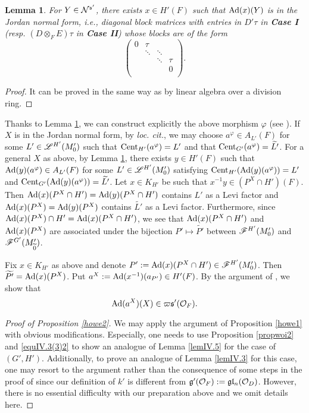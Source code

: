 \documentclass[a4paper]{amsart}
\newcommand{\wt}{\widetilde}                        \newcommand{\wh}{\widehat}                      \newcommand{\wpair}[1]{\left\{{#1}\right\}}
\newtheorem{lem}[thm]{Lemma}
\theoremstyle{definition}
\theoremstyle{remark}
\numberwithin{equation}{subsection}
\begin{document}
\begin{lem}\label{jordanform}
For $Y\in{\mathcal {N}}^{{\mathfrak{s}}'}$, there exists $x\in H'(F)$ such that ${\mathrm{Ad}}(x)(Y)$ is in the Jordan normal form, i.e., diagonal block matrices with entries in $D'\tau$ in \textbf{Case I} (resp. $(D\otimes_F E)\tau$ in \textbf{Case II}) whose blocks are of the form
$$ \left( \begin{array}{cccc}
  0 & \tau        &           &  \\
     & \ddots & \ddots &  \\
     &           & \ddots & \tau \\
     &           &           & 0  \\
  \end{array} \right). $$ 
\end{lem}

\begin{proof}
It can be proved in the same way as \cite[Lemmas 2.2 and 2.3]{MR1487565} by linear algebra over a division ring. 
\end{proof}

Thanks to Lemma \ref{jordanform}, we can construct explicitly the above morphism $\varphi$ (see \cite[p. 184]{MR2838836}). If $X$ is in the Jordan normal form, by {\it{loc. cit.}}, we may choose $a^\varphi\in A_{L'}(F)$ for some $L'\in\mathscr{L}^{H'}(M'_0)$ such that ${\mathrm{Cent}}_{H'}(a^\varphi)=L'$ and that $\Cent_{G'}(a^\varphi)=\wt{L'}$. For a general $X$ as above, by Lemma \ref{jordanform}, there exists $y\in H'(F)$ such that ${\mathrm{Ad}}(y)(a^\varphi)\in A_{L'}(F)$ for some $L'\in\mathscr{L}^{H'}(M'_0)$ satisfying ${\mathrm{Cent}}_{H'}({\mathrm{Ad}}(y)(a^\varphi))=L'$ and $\Cent_{G'}(\Ad(y)(a^\varphi))=\wt{L'}$. Let $x\in K_{H'}$ be such that $x^{-1}y\in(P^X\cap H')(F)$. Then ${\mathrm{Ad}}(x)(P^X\cap H')={\mathrm{Ad}}(y)(P^X\cap H')$ contains $L'$ as a Levi factor and ${\mathrm{Ad}}(x)(P^X)={\mathrm{Ad}}(y)(P^X)$ contains $\wt{L'}$ as a Levi factor. Furthermore, since ${\mathrm{Ad}}(x)(P^X)\cap H'={\mathrm{Ad}}(x)(P^X\cap H')$, we see that ${\mathrm{Ad}}(x)(P^X\cap H')$ and ${\mathrm{Ad}}(x)(P^X)$ are associated under the bijection $P'\mapsto\wt{P'}$ between $\mathscr{F}^{H'}(M'_0)$ and $\msf^{G'}(M'_{\wt{0}})$. 

Fix $x\in K_{H'}$ as above and denote $P':={\mathrm{Ad}}(x)(P^X \cap H')\in\mathscr{F}^{H'}(M'_0)$. Then $\wt{P'}=\Ad(x)(P^X)$. Put $a^X:={\mathrm{Ad}}(x^{-1})(a_{P'})\in H'(F)$. By the argument of \cite[(3) in \S IV.3]{MR1344131}, we show that
\begin{equation}\label{equIV.3(3)2}
 {\mathrm{Ad}}(a^X)(X)\in\varpi{\mathfrak{s}}'({\mathcal {O}}_F). 
\end{equation}

\begin{proof}[Proof of Proposition \ref{howe2}]
We may apply the argument of Proposition \ref{howe1} with obvious modifications. Especially, one needs to use Proposition \ref{propwoi2} and \eqref{equIV.3(3)2} to show an analogue of Lemma \ref{lemIV.5} for the case of $(G',H')$. Additionally, to prove an analogue of Lemma \ref{lemIV.3} for this case, one may resort to the argument rather than the consequence of some steps in the proof of \cite[Lemme IV.3]{MR1344131} since our definition of $k'$ is different from ${\mathfrak{g}}'({\mathcal {O}}_F):={\mathfrak{g}}{\mathfrak{l}}_n({\mathcal {O}}_D)$. However, there is no essential difficulty with our preparation above and we omit details here. 
\end{proof}
\end{document}
